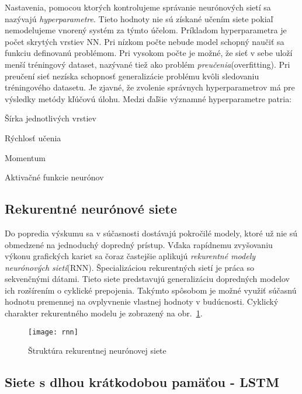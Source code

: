 Nastavenia, pomocou ktorých kontrolujeme správanie neurónových sietí sa nazývajú \textit{hyperparametre}. Tieto hodnoty nie sú získané učením siete pokiaľ nemodelujeme vnorený systém za týmto účelom. Príkladom hyperparametra je počet skrytých vrstiev NN. Pri nízkom počte nebude model schopný naučiť sa funkciu definovanú problémom. Pri vysokom počte je možné, že sieť v sebe uloží menší tréningový dataset, nazývané tiež ako problém \textit{preučenia}(overfitting). Pri preučení sieť nezíska schopnosť generalizácie problému kvôli sledovaniu tréningového datasetu. Je zjavné, že zvolenie správnych hyperparametrov má pre výsledky metódy kľúčovú úlohu. Medzi ďaľšie významné hyperparametre patria:
\begin{my_itemize}
	\item {Šírka jednotlivých vrstiev}
	\item {Rýchlosť učenia}
	\item {Momentum}
	\item {Aktivačné funkcie neurónov}
\end{my_itemize}


\subsection{Rekurentné neurónové siete}
\label{analyza_pokrocile_modely_nn}

Do popredia výskumu sa v súčasnosti dostávajú pokročilé modely, ktoré už nie sú obmedzené na jednoduchý dopredný prístup. Vďaka rapídnemu zvyšovaniu výkonu grafických kariet sa čoraz častejšie aplikujú \textit{rekurentné modely neurónových sietí}(RNN). Špecializáciou rekurentných sietí je práca so sekvenčnými dátami. Tieto siete predstavujú generalizáciu dopredných modelov ich rozšírením o cyklické prepojenia. Takýmto spôsobom je možné využiť súčasnú hodnotu premennej na ovplyvnenie vlastnej hodnoty v budúcnosti. Cyklický charakter rekurentného modelu je zobrazený na obr.~\ref{fig:rnn}.

\begin{figure}[H]
\begin{center}\texttt{[image: rnn]}\end{center}
\caption[rnn]{Štruktúra rekurentnej neurónovej siete}\label{fig:rnn}
\end{figure}

\subsection{Siete s dlhou krátkodobou pamäťou - LSTM}

